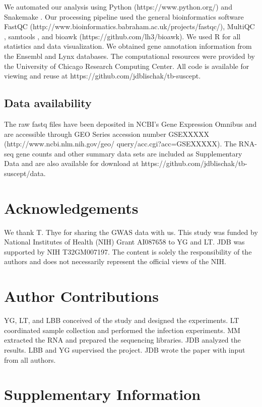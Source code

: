 \documentclass[fleqn,10pt]{wlscirep}
\newcommand{\beginsupplement}{%
 \setcounter{table}{0}
 \renewcommand{\thetable}{S\arabic{table}}%
 \setcounter{figure}{0}
 \renewcommand{\thefigure}{S\arabic{figure}}%
 }
\begin{document}
We automated our analysis using Python (https://www.python.org/) and
Snakemake \cite{Koster2012}. Our processing pipeline used the general
bioinformatics software FastQC
(http://www.bioinformatics.babraham.ac.uk/projects/fastqc/), MultiQC
\cite{Ewels2016}, samtools \cite{Li2009}, and bioawk
(https://github.com/lh3/bioawk). We used R \cite{R2015} for all
statistics and data visualization. We obtained gene annotation
information from the Ensembl \cite{Yates2016} and Lynx
\cite{Sulakhe2016} databases. The computational resources were
provided by the University of Chicago Research Computing Center. All
code is available for viewing and reuse at
https://github.com/jdblischak/tb-suscept.
\subsection*{Data availability}

The raw fastq files have been deposited in NCBI's Gene Expression
Omnibus \cite{Edgar2002} and are accessible through GEO Series
accession number GSEXXXXX (http://www.ncbi.nlm.nih.gov/geo/
query/acc.cgi?acc=GSEXXXXX). The RNA-seq gene counts and other summary
data sets are included as Supplementary Data and are also available
for download at https://github.com/jdblischak/tb-suscept/data.
\section*{Acknowledgements}

We thank T. Thye for sharing the GWAS data with us. This study was
funded by National Institutes of Health (NIH) Grant AI087658 to YG and
LT. JDB was supported by NIH T32GM007197. The content is solely the
responsibility of the authors and does not necessarily represent the
official views of the NIH.
\section*{Author Contributions}

YG, LT, and LBB conceived of the study and designed the experiments.
LT coordinated sample collection and performed the infection
experiments. MM extracted the RNA and prepared the sequencing
libraries. JDB analyzed the results. LBB and YG supervised the
project. JDB wrote the paper with input from all authors.



\clearpage\newpage
\beginsupplement
\section*{Supplementary Information}
\end{document}

